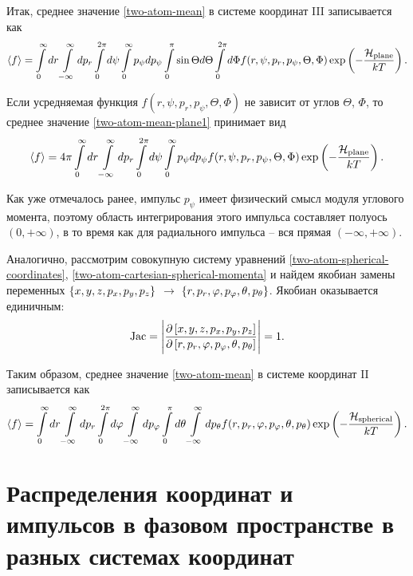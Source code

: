 Итак, среднее значение \eqref{two-atom-mean} в системе координат III записывается как
\begin{gather}
    \langle  f  \rangle = \int\limits_{0}^{\infty} dr \int\limits_{-\infty}^\infty dp_r \int\limits_0^{2\pi} d\psi \int\limits_0^\infty p_\psi dp_\psi \int\limits_0^\pi \sin \Theta d\Theta \int\limits_0^{2\pi} d\Phi f(r, \psi, p_r, p_\psi, \Theta, \Phi) \exp \left( -\frac{\mathcal{H}_\text{plane}}{k T} \right). \label{two-atom-mean-plane1} 
\end{gather}

Если усредняемая функция $f(r, \psi, p_r, p_\psi, \Theta, \Phi)$ не зависит от углов $\Theta$, $\Phi$, то среднее значение  \eqref{two-atom-mean-plane1} принимает вид 
\begin{gather}
    \langle  f  \rangle = 4 \pi \int\limits_{0}^{\infty} dr \int\limits_{-\infty}^\infty dp_r \int\limits_0^{2\pi} d\psi \int\limits_0^\infty p_\psi dp_\psi f(r, \psi, p_r, p_\psi, \Theta, \Phi) \exp \left( -\frac{\mathcal{H}_\text{plane}}{k T} \right). \label{two-atom-mean-plane2} 
\end{gather}

Как уже отмечалось ранее, импульс $p_\psi$ имеет физический смысл модуля углового момента, поэтому область интегрирования этого импульса составляет полуось $(0, +\infty)$, в то время как для радиального импульса -- вся прямая $(-\infty, +\infty)$. \par
Аналогично, рассмотрим совокупную систему уравнений \eqref{two-atom-spherical-coordinates}, \eqref{two-atom-cartesian-spherical-momenta} и найдем якобиан замены переменных $\left\{ x, y, z, p_x, p_y, p_z \right\}$ $\rightarrow$ $\left\{ r, p_r, \varphi, p_\varphi, \theta, p_\theta \right\}$. Якобиан оказывается единичным: 
\begin{gather}
    \text{Jac} = \Bigg\vert \frac{\partial \left[ x, y, z, p_x, p_y, p_z \right]}{\partial \left[ r, p_r, \varphi, p_\varphi, \theta, p_\theta \right]} \Bigg\vert = 1. 
\end{gather}

Таким образом, среднее значение \eqref{two-atom-mean} в системе координат II записывается как
\begin{gather}
    \langle f \rangle = \int\limits_0^\infty dr \int\limits_{-\infty}^\infty dp_r \int\limits_0^{2\pi} d\varphi \int\limits_{-\infty}^\infty dp_\varphi \int\limits_0^\pi d\theta \int\limits_{-\infty}^\infty dp_\theta f(r, p_r, \varphi, p_\varphi, \theta, p_\theta) \exp \left( -\frac{\mathcal{H}_\text{spherical}}{k T} \right). \label{two-atom-mean-spherical}
\end{gather}

\section{Распределения координат и импульсов в фазовом пространстве в разных системах координат} \label{section:two-atom-distributions} 

